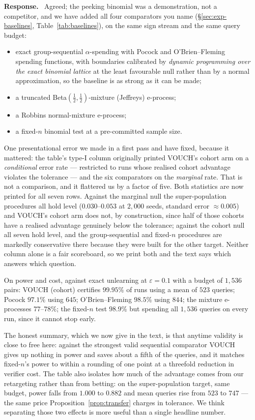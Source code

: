 \documentclass[11pt,a4paper]{article}
\newcommand{\eps}{\varepsilon}
\newenvironment{reply}{%
  \par\smallskip\noindent\textbf{\color{acol}Response.}\ \begingroup}{\endgroup\par}
\begin{document}
\begin{reply}
Agreed; the peeking binomial was a demonstration, not a competitor, and we have added
all four comparators you name (\S\ref{sec:exp-baselines}, Table~\ref{tab:baselines}), on the same sign stream and the same
query budget:
\begin{itemize}[leftmargin=1.4em,itemsep=0pt,topsep=2pt]
\item exact group-sequential $\alpha$-spending with Pocock and O'Brien--Fleming
spending functions, with boundaries calibrated by \emph{dynamic programming over the
exact binomial lattice} at the least favourable null rather than by a normal
approximation, so the baseline is as strong as it can be made;
\item a truncated Beta$(\tfrac12,\tfrac12)$-mixture (Jeffreys) e-process;
\item a Robbins normal-mixture e-process;
\item a fixed-$n$ binomial test at a pre-committed sample size.
\end{itemize}

One presentational error we made in a first pass and have fixed, because it mattered:
the table's type-I column originally printed VOUCH's cohort arm on a
\emph{conditional} error rate --- restricted to runs whose realised cohort advantage
violates the tolerance --- and the six comparators on the \emph{marginal} rate. That is
not a comparison, and it flattered us by a factor of five. Both statistics are now
printed for all seven rows. Against the marginal null the super-population procedures
all hold level ($0.030$--$0.053$ at $2{,}000$ seeds, standard error $\approx 0.005$) and
VOUCH's cohort arm does not, by construction, since half of those cohorts have a
realised advantage genuinely below the tolerance; against the cohort null all seven
hold level, and the group-sequential and fixed-$n$ procedures are markedly conservative
there because they were built for the other target. Neither column alone is a fair
scoreboard, so we print both and the text says which answers which question.

On power and cost, against exact unlearning at $\eps=0.1$ with a budget of $1{,}536$
pairs: VOUCH (cohort) certifies $99.95\%$ of runs using a mean of $523$ queries;
Pocock $97.1\%$ using $645$; O'Brien--Fleming $98.5\%$ using $844$; the mixture
e-processes $77$--$78\%$; the fixed-$n$ test $98.9\%$ but spending all $1{,}536$ queries
on every run, since it cannot stop early.

The honest summary, which we now give in the text, is that anytime validity is close to
free here: against the strongest valid sequential comparator VOUCH gives up nothing in
power and saves about a fifth of the queries, and it matches fixed-$n$'s power to
within a rounding of one point at a threefold reduction in verifier cost. The table also isolates how
much of the advantage comes from our retargeting rather than from betting: on the
super-population target, same budget, power falls from $1.000$ to $0.882$ and mean
queries rise from $523$ to $747$ --- the same price Proposition~\ref{prop:transfer} charges in tolerance.
We think separating those two effects is more useful than a single headline number.
\end{reply}
\end{document}

